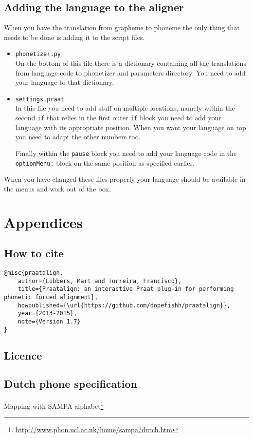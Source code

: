 \section{Adding the language to the aligner}
When you have the translation from grapheme to phoneme the only thing that
needs to be done is adding it to the script files.
\begin{itemize}
	\item \texttt{phonetizer.py}\\
		On the bottom of this file there is a dictionary containing all the
		translations from language code to phonetizer and parameters directory. You
		need to add your language to that dictionary.
	\item \texttt{settings.praat}\\
		In this file you need to add stuff on multiple locations, namely within the
		second \texttt{if} that relies in the first outer \texttt{if} block you
		need to add your language with its appropriate position. When you want your
		language on top you need to adapt the other numbers too.

		Finally within the \texttt{pause} block you need to add your language code
		in the \texttt{optionMenu:} block on the same position as specified
		earlier.
\end{itemize}
When you have changed these files properly your language should be available in
the menus and work out of the box.

\chapter{Appendices}
\section{How to cite}
\begin{lstlisting}[caption={Bibtex snippet},breaklines=true]
@misc{praatalign,
	author={Lubbers, Mart and Torreira, Francisco},
	title={Praatalign: an interactive Praat plug-in for performing phonetic forced alignment},
	howpublished={\url{https://github.com/dopefishh/praatalign}},
	year={2013-2015},
	note={Version 1.7}
}
\end{lstlisting}

\section{Licence}


\newpage
\section{Dutch phone specification}
\label{sec:sldutch}
Mapping with SAMPA
alphabet\footnote{\url{http://www.phon.ucl.ac.uk/home/sampa/dutch.htm}}

